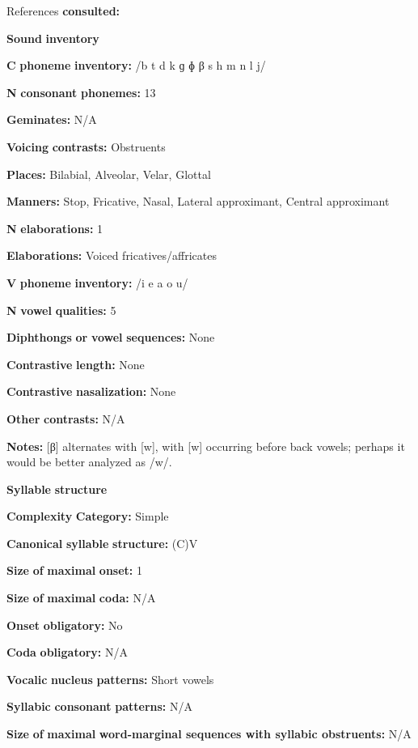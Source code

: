 References \textbf{consulted:} \citet{Dutton1996}

\textbf{Sound} \textbf{inventory}

\textbf{C} \textbf{phoneme} \textbf{inventory:} /b t d k ɡ ɸ β s h m n l j/

\textbf{N} \textbf{consonant} \textbf{phonemes:} 13

\textbf{Geminates:} N/A

\textbf{Voicing} \textbf{contrasts:} Obstruents

\textbf{Places:} Bilabial, Alveolar, Velar, Glottal

\textbf{Manners:} Stop, Fricative, Nasal, Lateral approximant, Central approximant

\textbf{N} \textbf{elaborations:} 1

\textbf{Elaborations:} Voiced fricatives/affricates

\textbf{V} \textbf{phoneme} \textbf{inventory:} /i e a o u/

\textbf{N} \textbf{vowel} \textbf{qualities:} 5

\textbf{Diphthongs} \textbf{or} \textbf{vowel} \textbf{sequences:} None

\textbf{Contrastive} \textbf{length:} None

\textbf{Contrastive} \textbf{nasalization:} None

\textbf{Other} \textbf{contrasts:} N/A

\textbf{Notes:} [β] alternates with [w], with [w] occurring before back vowels; perhaps it would be better analyzed as /w/.

\textbf{Syllable} \textbf{structure}

\textbf{Complexity} \textbf{Category:} Simple

\textbf{Canonical} \textbf{syllable} \textbf{structure:} (C)V \citep[7]{Dutton1996}

\textbf{Size} \textbf{of} \textbf{maximal} \textbf{onset:} 1

\textbf{Size} \textbf{of} \textbf{maximal} \textbf{coda:} N/A

\textbf{Onset} \textbf{obligatory:} No

\textbf{Coda} \textbf{obligatory:} N/A

\textbf{Vocalic} \textbf{nucleus} \textbf{patterns:} Short vowels

\textbf{Syllabic} \textbf{consonant} \textbf{patterns:} N/A

\textbf{Size} \textbf{of} \textbf{maximal} \textbf{word{}-marginal sequences with syllabic obstruents:} N/A

